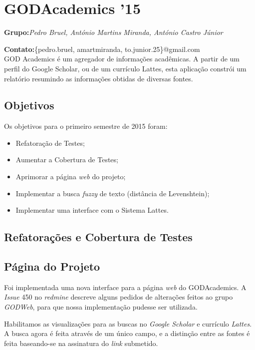 \documentclass[12pt]{article}
\begin{document}
\section{GODAcademics '15}

\textbf{Grupo:}\textit{Pedro Bruel, António Martins Miranda, António Castro Júnior}

\textbf{Contato:}\{pedro.bruel, amartmiranda, to.junior.25\}@gmail.com\\

GOD Academics é um agregador de informações acadêmicas. A partir de um perfil 
do Google Scholar, ou de um currículo Lattes, esta aplicação constrói 
um relatório resumindo as informações obtidas de diversas fontes.

\subsection{Objetivos}

Os objetivos para o primeiro semestre de 2015 foram:

\begin{itemize}
    \item Refatoração de Testes;
    \item Aumentar a Cobertura de Testes;
    \item Aprimorar a página \emph{web} do projeto;
    \item Implementar a busca \emph{fuzzy} de texto (distância de Levenshtein);
    \item Implementar uma interface com o Sistema Lattes.
\end{itemize}

\subsection{Refatorações e Cobertura de Testes}



\subsection{Página do Projeto}

Foi implementada uma nova interface para a página \emph{web}
do GODAcademics. A \emph{Issue} 450 no \emph{redmine} descreve
alguns pedidos de alterações feitos ao grupo \emph{GODWeb},
para que nossa implementação pudesse ser utilizada.

Habilitamos as visualizações para as buscas no \emph{Google Scholar}
e currículo \emph{Lattes}. A busca agora é feita através de um único
campo, e a distinção entre as fontes é feita baseando-se na assinatura
do \emph{link} submetido.
\end{document}
